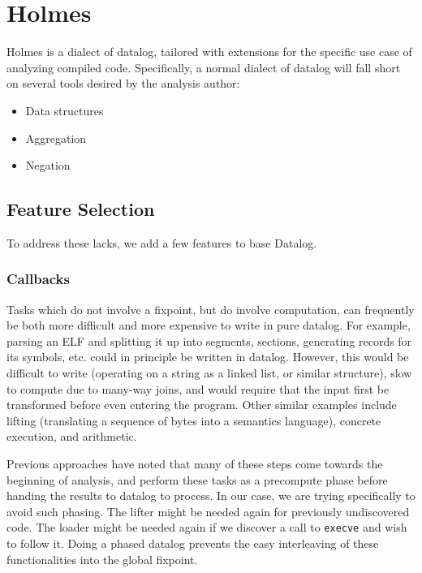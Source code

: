 \chapter{Holmes}
\label{chap:holmes}
Holmes is a dialect of datalog, tailored with extensions for the specific use case of analyzing compiled code.
Specifically, a normal dialect of datalog will fall short on several tools desired by the analysis author:
\begin{itemize}
	\item Data structures
	\item Aggregation
	\item Negation
\end{itemize}

\section{Feature Selection}
To address these lacks, we add a few features to base Datalog.
\subsection{Callbacks}
Tasks which do not involve a fixpoint, but do involve computation, can frequently be both more difficult and more expensive to write in pure datalog.
For example, parsing an ELF and splitting it up into segments, sections, generating records for its symbols, etc. could in principle be written in datalog.
However, this would be difficult to write (operating on a string as a linked list, or similar structure), slow to compute due to many-way joins, and would require that the input first be transformed before even entering the program.
Other similar examples include lifting (translating a sequence of bytes into a semantics language), concrete execution, and arithmetic.

Previous approaches have noted that many of these steps come towards the beginning of analysis, and perform these tasks as a precompute phase before handing the results to datalog to process.
In our case, we are trying specifically to avoid such phasing.
The lifter might be needed again for previously undiscovered code.
The loader might be needed again if we discover a call to \texttt{execve} and wish to follow it.
Doing a phased datalog prevents the easy interleaving of these functionalities into the global fixpoint.

